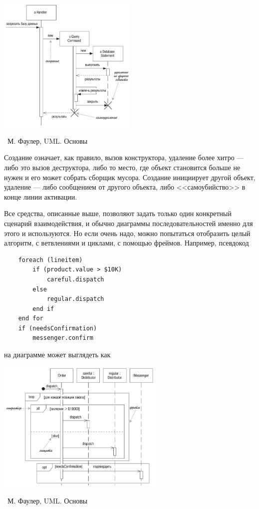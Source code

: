 \documentclass[a5paper]{article}
\newcommand{\attribution}[1] {
    \vspace{-5mm}\begin{flushright}\begin{scriptsize}%
    {\textcopyright\, #1}\end{scriptsize}\end{flushright}
}
\begin{document}
\begin{center}
    \includegraphics[width=0.5\textwidth]{sequenceDiagramCreationAndDeletion.png}
    \attribution{М. Фаулер, UML. Основы}
\end{center}

Создание означает, как правило, вызов конструктора, удаление более хитро --- либо это вызов деструктора, либо то место, где объект становится больше не нужен и его может собрать сборщик мусора. Создание инициирует другой объект, удаление --- либо сообщением от другого объекта, либо <<самоубийство>> в конце линии активации.

Все средства, описанные выше, позволяют задать только один конкретный сценарий взаимодействия, и обычно диаграммы последовательностей именно для этого и используются. Но если очень надо, можно попытаться отобразить целый алгоритм, с ветвлениями и циклами, с помощью фреймов. Например, псевдокод

\begin{verbatim}
    foreach (lineitem)
        if (product.value > $10K)
            careful.dispatch
        else
            regular.dispatch
        end if
    end for
    if (needsConfirmation) 
        messenger.confirm
\end{verbatim}

на диаграмме может выглядеть как

\begin{center}
    \includegraphics[width=0.6\textwidth]{sequenceDiagramFrames.png}
    \attribution{М. Фаулер, UML. Основы}
\end{center}
\end{document}
